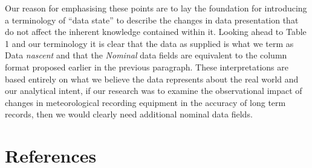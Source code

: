 \documentclass[smallextended]{svjour3}       %
\begin{document}
Our reason for emphasising these points are to lay the foundation for
introducing a terminology of ``data state'' to describe the changes in
data presentation that do not affect the inherent knowledge contained
within it. Looking ahead to Table 1 and our terminology it is clear that the data as supplied is what we term as Data \emph{nascent} and that the \emph{Nominal} data fields are equivalent to the column format proposed earlier in the previous paragraph. These interpretations are based entirely on what we believe the data represents about the real world and our analytical intent, if our research was to examine the observational impact of changes in meteorological recording equipment in the accuracy of long term records, then we would clearly need additional nominal data fields.

\hypertarget{references}{%
\section*{References}\label{references}}
\end{document}
